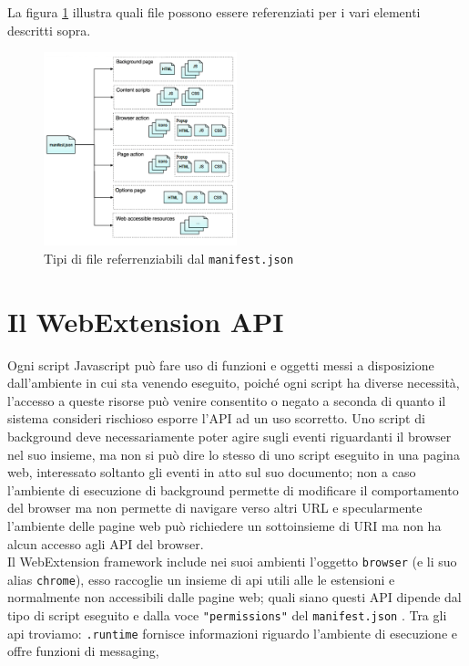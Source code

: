 \documentclass{sapthesis}
\newcommand{\code}[1]{\texttt{#1}}
\newcommand{\attr}[1]{\code{.#1}}
\newcommand{\JS}{Javascript }
\newcommand{\manifest}{\code{manifest.json} }
\begin{document}
        La figura \ref{fig:manifest-content} illustra quali file possono essere referenziati per i vari elementi descritti sopra.

        \begin{figure}[ht]
            \centering                                                  
            \includegraphics[width=0.5\textwidth]{webextension-manifest-content}
            \caption{Tipi di file referrenziabili dal \manifest }
            \label{fig:manifest-content}                             
        \end{figure}

    \section{Il WebExtension API}
    \label{webextension-api}
        Ogni script \JS può fare uso di funzioni e oggetti messi a disposizione dall'ambiente in cui sta venendo
        eseguito, poiché ogni script ha diverse necessità, l'accesso a queste risorse può venire consentito o negato
        a seconda di quanto il sistema consideri rischioso esporre l'API ad un uso scorretto. Uno script di background
        deve necessariamente poter agire sugli eventi riguardanti il browser nel suo insieme, ma non si può dire lo
        stesso di uno script eseguito in una pagina web, interessato soltanto gli eventi in atto sul suo documento;
        non a caso l'ambiente di esecuzione di background permette di modificare il comportamento del
        browser ma non permette di navigare verso altri URL e specularmente l'ambiente delle pagine web può
        richiedere un sottoinsieme di URI ma non ha alcun accesso agli API del browser.\\
        Il WebExtension framework include nei suoi ambienti l'oggetto \code{browser} (e li suo alias \code{chrome}),
        esso raccoglie un insieme di api utili alle le estensioni e normalmente non accessibili dalle pagine web;
        quali siano questi API dipende dal tipo di script eseguito e dalla voce \code{"permissions"} del \manifest.
        Tra gli api troviamo: \attr{runtime} \cite{browser-runtime} fornisce informazioni riguardo l'ambiente di 
        esecuzione e offre funzioni di messaging, 
    
\end{document}
